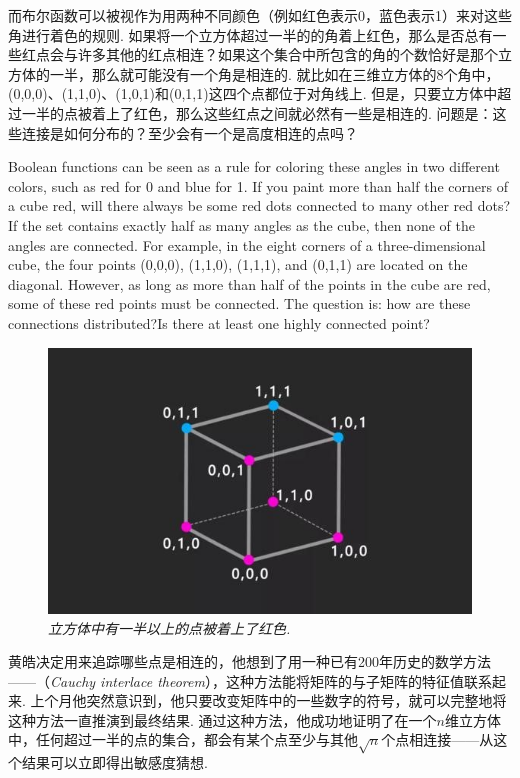 \begin{multicols}{2}
    而布尔函数可以被视作为用两种不同颜色（例如红色表示0，蓝色表示1）来对这些角进行着色的规则. 如果将一个立方体超过一半的的角着上红色，那么是否总有一些红点会与许多其他的红点相连？如果这个集合中所包含的角的个数恰好是那个立方体的一半，那么就可能没有一个角是相连的. 就比如在三维立方体的8个角中，(0,0,0)、(1,1,0)、(1,0,1)和(0,1,1)这四个点都位于对角线上. 但是，只要立方体中超过一半的点被着上了红色，那么这些红点之间就必然有一些是相连的. 问题是：这些连接是如何分布的？至少会有一个是高度相连的点吗？
    
    Boolean functions can be seen as a rule for coloring these angles in two different colors, such as red for 0 and blue for 1. If you paint more than half the corners of a cube red, will there always be some red dots connected to many other red dots?If the set contains exactly half as many angles as the cube, then none of the angles are connected. For example, in the eight corners of a three-dimensional cube, the four points (0,0,0), (1,1,0), (1,1,1), and (0,1,1) are located on the diagonal. However, as long as more than half of the points in the cube are red, some of these red points must be connected. The question is: how are these connections distributed?Is there at least one highly connected point?
    
    \begin{figure}[H]
        \centering
      \includegraphics[width=\linewidth]{IMG/201908/2.jpg}
      \caption{\textit{立方体中有一半以上的点被着上了红色. }}
    \end{figure}
    
    黄皓决定用来追踪哪些点是相连的，他想到了用一种已有200年历史的数学方法——（\textit{Cauchy interlace theorem}），这种方法能将矩阵的与子矩阵的特征值联系起来. 上个月他突然意识到，他只要改变矩阵中的一些数字的符号，就可以完整地将这种方法一直推演到最终结果. 通过这种方法，他成功地证明了在一个$n$维立方体中，任何超过一半的点的集合，都会有某个点至少与其他$\sqrt{n}$个点相连接——从这个结果可以立即得出敏感度猜想. 
    

\end{multicols}
